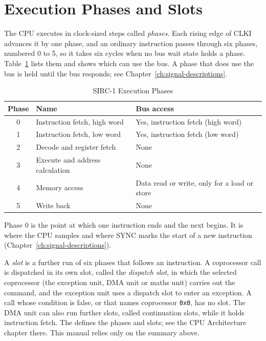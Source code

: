 \section{Execution Phases and Slots}
\label{sec:execution-phases}

The CPU executes in clock-sized steps called \emph{phases}. Each rising edge of CLKI advances it by one phase, and an
ordinary instruction passes through six phases, numbered 0 to 5, so it takes six cycles when no bus wait state holds a
phase. Table~\ref{tab:execution-phases} lists them and shows which can use the bus. A phase that does use the bus is
held until the bus responds; see Chapter~\ref{ch:signal-descriptions}.

\begin{table}[H]
	\centering
	\begin{tabular}{clp{7.5cm}}
		\toprule
		\textbf{Phase} & \textbf{Name}                   & \textbf{Bus access}                          \\
		\midrule
		0              & Instruction fetch, high word    & Yes, instruction fetch (high word)           \\
		1              & Instruction fetch, low word     & Yes, instruction fetch (low word)            \\
		2              & Decode and register fetch       & None                                         \\
		3              & Execute and address calculation & None                                         \\
		4              & Memory access                   & Data read or write, only for a load or store \\
		5              & Write back                      & None                                         \\
		\bottomrule
	\end{tabular}
	\caption{SIRC-1 Execution Phases}
	\label{tab:execution-phases}
\end{table}

Phase 0 is the point at which one instruction ends and the next begins. It is where the CPU samples 
and where SYNC marks the start of a new instruction (Chapter~\ref{ch:signal-descriptions}).

A \emph{slot} is a further run of six phases that follows an instruction. A coprocessor call is dispatched in its own
slot, called the \emph{dispatch slot}, in which the selected coprocessor (the exception unit, DMA unit or maths unit)
carries out the command, and the exception unit uses a dispatch slot to enter an exception. A call whose condition is
false, or that names coprocessor \texttt{0x0}, has no slot. The DMA unit can also run further slots, called
continuation slots, while it holds instruction fetch. The \archmanual{} defines the phases and slots; see the CPU
Architecture chapter there. This manual relies only on the summary above.

